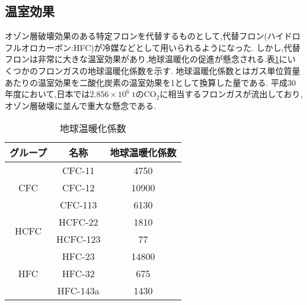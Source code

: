 \subsection{温室効果}
オゾン層破壊効果のある特定フロンを代替するものとして,代替フロン(ハイドロフルオロカーボン:HFC)が冷媒などとして用いられるようになった.
しかし,代替フロンは非常に大きな温室効果があり,地球温暖化の促進が懸念される.表\ref{tab:gwp}にいくつかのフロンガスの地球温暖化係数を示す.
地球温暖化係数とはガス単位質量あたりの温室効果を二酸化炭素の温室効果を1として換算した量である.
平成30年度において,日本では$2.856\times10^6$ \si{\tonne}の$\mathrm{CO_2}$に相当するフロンガスが流出しており\cite{環境省漏えい量の66:online},
オゾン層破壊に並んで重大な懸念である.
\begin{table}[h]
   \caption{地球温暖化係数\cite{GWPpdf45:online}}
   \label{tab:gwp}
   \centering
   \begin{tabular}{c|cc}
    \hline
    グループ&名称&地球温暖化係数\\
    \hline \hline
    \multirow{3}{*}{CFC}&CFC-11&4750\\
    &CFC-12&10900\\
    &CFC-113&6130\\
    \hline
    \multirow{2}{*}{HCFC}&HCFC-22&1810\\
    &HCFC-123&77\\
    \hline
    \multirow{3}{*}{HFC}&HFC-23&14800\\
    &HFC-32&675\\
    &HFC-143a&1430\\
    \hline
   \end{tabular}
\end{table}